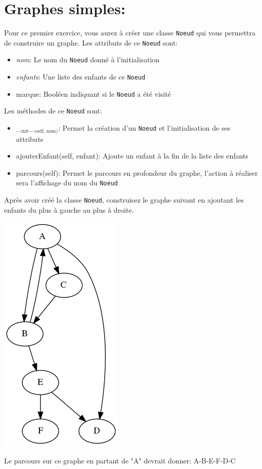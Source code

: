 \documentclass{article}
\begin{document}
\clearpage
\section{Graphes simples:}
\label{sec-3}
Pour ce premier exercice, vous aurez à créer une classe \verb~Noeud~ qui vous permettra de construire un graphe.
Les attributs de ce \verb~Noeud~ sont:
\begin{itemize}
\item \emph{nom}: Le nom du \verb~Noeud~ donné à l'initialisation
\item \emph{enfants}: Une liste des enfants de ce \verb~Noeud~
\item marque: Booléen indiquant si le \verb~Noeud~ a été visité
\end{itemize}

Les méthodes de ce \verb~Noeud~ sont:
\begin{itemize}
\item \_$_{\text{init}}$\_$_{\text{(self, nom)}}$: Permet la création d'un \verb~Noeud~ et l'initialisation de ses attributs
\item ajouterEnfant(self, enfant): Ajoute un enfant à la fin de la liste des enfants
\item parcours(self): Permet le parcours en profondeur du graphe, l'action à réaliser sera l'affichage du nom du \verb~Noeud~
\end{itemize}

Après avoir créé la classe \verb~Noeud~, construisez le graphe suivant en ajoutant les enfants du plus à gauche au plus à droite.

\begin{center}
\includegraphics[width=.25\linewidth]{./img/graphe.png}
\end{center}

Le parcours sur ce graphe en partant de "A" devrait donner: A-B-E-F-D-C
\end{document}
